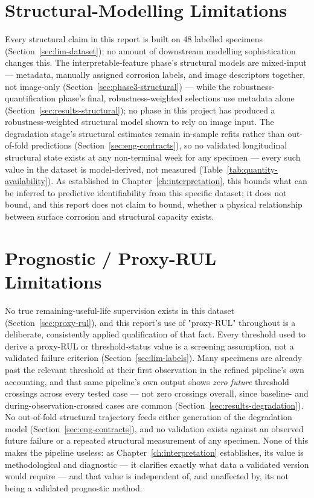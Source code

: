 \section{Structural-Modelling Limitations}
\label{sec:lim-structural}

Every structural claim in this report is built on 48 labelled specimens
(Section~\ref{sec:lim-dataset}); no amount of downstream modelling
sophistication changes this. The interpretable-feature phase's structural
models are mixed-input — metadata, manually assigned corrosion labels, and
image descriptors together, not image-only
(Section~\ref{sec:phase3-structural}) — while the robustness-quantification
phase's final, robustness-weighted selections use metadata alone
(Section~\ref{sec:results-structural}); no phase in this project has
produced a robustness-weighted structural model shown to rely on image
input. The degradation stage's structural estimates remain in-sample
refits rather than out-of-fold predictions (Section~\ref{sec:eng-contracts}),
so no validated longitudinal structural state exists at any non-terminal
week for any specimen — every such value in the dataset is model-derived,
not measured (Table~\ref{tab:quantity-availability}). As established in
Chapter~\ref{ch:interpretation}, this bounds what can be inferred to
predictive identifiability from this specific dataset; it does not bound,
and this report does not claim to bound, whether a physical relationship
between surface corrosion and structural capacity exists.

\section{Prognostic / Proxy-RUL Limitations}
\label{sec:lim-rul}

No true remaining-useful-life supervision exists in this dataset
(Section~\ref{sec:proxy-rul}), and this report's use of "proxy-RUL"
throughout is a deliberate, consistently applied qualification of that
fact. Every threshold used to derive a proxy-RUL or threshold-status value
is a screening assumption, not a validated failure criterion
(Section~\ref{sec:lim-labels}). Many specimens are already past the
relevant threshold at their first observation in the refined pipeline's
own accounting, and that same pipeline's own output shows \emph{zero
future} threshold crossings across every tested case — not zero crossings
overall, since baseline- and during-observation-crossed cases are common
(Section~\ref{sec:results-degradation}). No out-of-fold structural
trajectory feeds either generation of the degradation model
(Section~\ref{sec:eng-contracts}), and no validation exists against an
observed future failure or a repeated structural measurement of any
specimen. None of this makes the pipeline useless: as
Chapter~\ref{ch:interpretation} establishes, its value is methodological
and diagnostic — it clarifies exactly what data a validated version would
require — and that value is independent of, and unaffected by, its not
being a validated prognostic method.

